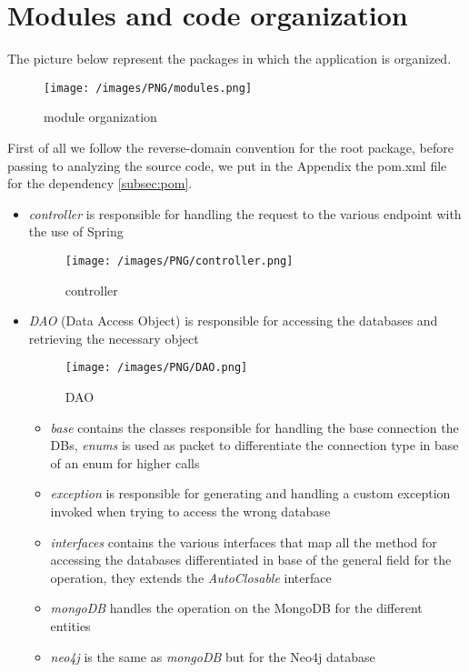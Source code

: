 %
%
\section{Modules and code organization}
\justifying
The picture below represent the packages in which the application is organized.
\begin{figure}[H]
\begin{center}
\texttt{[image: /images/PNG/modules.png]}
\caption{module organization}
\end{center}
\end{figure}
First of all we follow the reverse-domain convention for the root package, before passing to analyzing the source code, we put in the Appendix the pom.xml file for the dependency \cref{subsec:pom}.

\begin{itemize}
	\item \emph{controller} is responsible for handling the request to the various endpoint with the use of Spring
	\begin{figure}[H]
	\begin{center}
	\texttt{[image: /images/PNG/controller.png]}
	\caption{controller}
	\end{center}
	\end{figure}
	
	\item \emph{DAO} (Data Access Object) is responsible for accessing the databases and retrieving the necessary object
	\begin{figure}[H]
	\begin{center}
	\texttt{[image: /images/PNG/DAO.png]}
	\caption{DAO}
	\end{center}
	\end{figure}
	\begin{itemize}
		\item \emph{base} contains the classes responsible for handling the base connection the DBs, \emph{enums} is used as packet to differentiate the connection type in base of an enum for higher calls
	
		\item \emph{exception} is responsible for generating and handling a custom exception invoked when trying to access the wrong database
	
		\item \emph{interfaces} contains the various interfaces that map all the method for accessing the databases differentiated in base of the general field for the operation, they extends the \emph{AutoClosable} interface
		\item \emph{mongoDB} handles the operation on the MongoDB for the different entities
		\item \emph{neo4j} is the same as \emph{mongoDB} but for the Neo4j database
	

\end{itemize}
\end{itemize}
